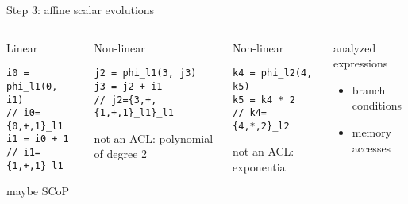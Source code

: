 \documentclass{beamer}
\begin{document}
\begin{frame}[fragile]{Step 3: affine scalar evolutions}
  \begin{columns}[T,onlytextwidth] %
    \begin{block}{\small Linear}
      \begin{lstlisting}
i0 = phi_l1(0, i1)
// i0={0,+,1}_l1
i1 = i0 + 1
// i1={1,+,1}_l1
      \end{lstlisting}

      {\small \color{myblue} maybe SCoP}
    \end{block}
    \pause
    \begin{block}{\small Non-linear} 
      \begin{lstlisting}
j2 = phi_l1(3, j3)
j3 = j2 + i1
// j2={3,+,{1,+,1}_l1}_l1
      \end{lstlisting}
      {\small \color{myred} not an ACL: polynomial of degree 2}
    \end{block}
    \pause
    \begin{block}{\small Non-linear} 
      \begin{lstlisting}
k4 = phi_l2(4, k5)
k5 = k4 * 2
// k4={4,*,2}_l2
      \end{lstlisting}
      {\small \color{myred} not an ACL: exponential}
    \end{block}

    \vspace{.5cm}
    \pause
    \begin{block}{\small analyzed expressions}
      \begin{itemize}
      \item branch conditions
      \item memory accesses
      \end{itemize}
    \end{block}
  \end{columns}
\end{frame}
\end{document}
